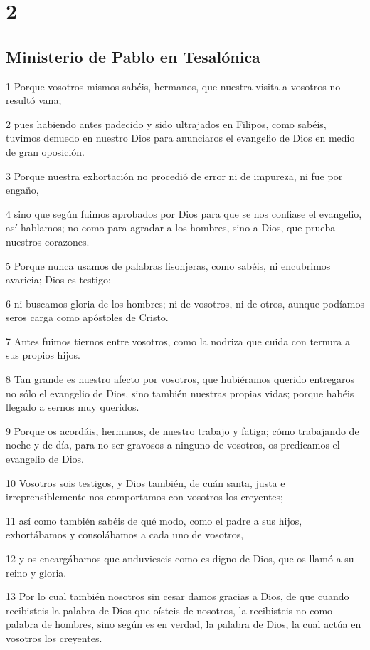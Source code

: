 \chapter{2}

\section*{Ministerio de Pablo en Tesalónica}

\par 1 Porque vosotros mismos sabéis, hermanos, que nuestra visita a vosotros no resultó vana;
\par 2 pues habiendo antes padecido y sido ultrajados en Filipos, como sabéis, tuvimos denuedo en nuestro Dios para anunciaros el evangelio de Dios en medio de gran oposición.
\par 3 Porque nuestra exhortación no procedió de error ni de impureza, ni fue por engaño,
\par 4 sino que según fuimos aprobados por Dios para que se nos confiase el evangelio, así hablamos; no como para agradar a los hombres, sino a Dios, que prueba nuestros corazones.
\par 5 Porque nunca usamos de palabras lisonjeras, como sabéis, ni encubrimos avaricia; Dios es testigo;
\par 6 ni buscamos gloria de los hombres; ni de vosotros, ni de otros, aunque podíamos seros carga como apóstoles de Cristo.
\par 7 Antes fuimos tiernos entre vosotros, como la nodriza que cuida con ternura a sus propios hijos.
\par 8 Tan grande es nuestro afecto por vosotros, que hubiéramos querido entregaros no sólo el evangelio de Dios, sino también nuestras propias vidas; porque habéis llegado a sernos muy queridos.
\par 9 Porque os acordáis, hermanos, de nuestro trabajo y fatiga; cómo trabajando de noche y de día, para no ser gravosos a ninguno de vosotros, os predicamos el evangelio de Dios.
\par 10 Vosotros sois testigos, y Dios también, de cuán santa, justa e irreprensiblemente nos comportamos con vosotros los creyentes;
\par 11 así como también sabéis de qué modo, como el padre a sus hijos, exhortábamos y consolábamos a cada uno de vosotros,
\par 12 y os encargábamos que anduvieseis como es digno de Dios, que os llamó a su reino y gloria.
\par 13 Por lo cual también nosotros sin cesar damos gracias a Dios, de que cuando recibisteis la palabra de Dios que oísteis de nosotros, la recibisteis no como palabra de hombres, sino según es en verdad, la palabra de Dios, la cual actúa en vosotros los creyentes.
